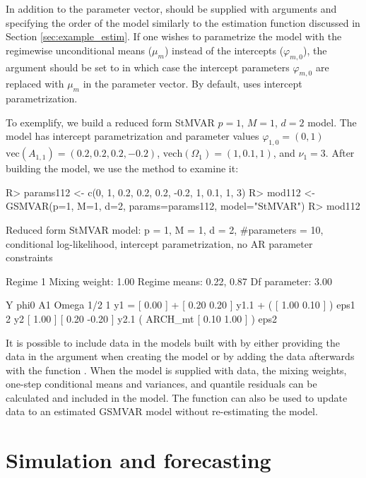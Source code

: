 \documentclass[nojss]{jss}
\begin{document}
In addition to the parameter vector,  should be supplied with arguments  and  specifying the order of the model similarly to the estimation function  discussed in Section \ref{sec:example_estim}. If one wishes to parametrize the model with the regimewise unconditional means ($\mu_m$) instead of the intercepts ($\varphi_{m,0}$), the argument  should be set to  in which case the intercept parameters $\varphi_{m,0}$ are replaced with $\mu_m$ in the parameter vector. By default,  uses intercept parametrization.

To exemplify, we build a reduced form StMVAR $p=1$, $M=1$, $d=2$ model. The model has intercept parametrization and parameter values $\varphi_{1,0}=(0, 1)$ $\text{vec}(A_{1,1}) = (0.2, 0.2, 0.2, -0.2)$, $\text{vech}(\Omega_1) = (1, 0.1, 1)$, and $\nu_1 = 3$. After building the model, we use the  method to examine it:
%
\begin{CodeChunk}
\begin{CodeInput}
R> params112 <- c(0, 1, 0.2, 0.2, 0.2, -0.2, 1, 0.1, 1, 3)
R> mod112 <- GSMVAR(p=1, M=1, d=2, params=params112, model="StMVAR")
R> mod112
\end{CodeInput}
\begin{CodeOutput}
Reduced form StMVAR model:
 p = 1, M = 1, d = 2, #parameters = 10,
 conditional log-likelihood, intercept parametrization, no AR parameter
 constraints

Regime 1
Mixing weight: 1.00
Regime means: 0.22, 0.87
Df parameter:  3.00

   Y     phi0          A1                            Omega          1/2
1 y1 = [ 0.00 ] + [  0.20  0.20 ] y1.1 + (         [  1.00 0.10 ] )     eps1
2 y2   [ 1.00 ]   [  0.20 -0.20 ] y2.1   ( ARCH_mt [  0.10 1.00 ] )     eps2
\end{CodeOutput}
\end{CodeChunk}
%

It is possible to include data in the models built with  by either providing the data in the argument  when creating the model or by adding the data afterwards with the function . When the model is supplied with data, the mixing weights, one-step conditional means and variances, and quantile residuals can be calculated and included in the model. The function  can also be used to update data to an estimated GSMVAR model without re-estimating the model.


\section{Simulation and forecasting}\label{sec:simufore}
\end{document}
